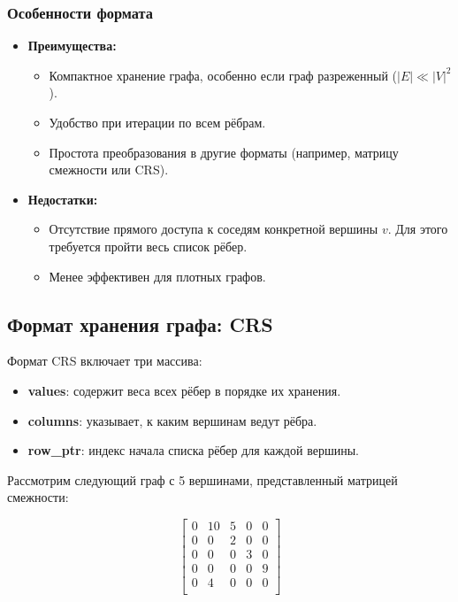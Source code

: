 \documentclass[12pt]{article}
\begin{document}
\subsubsection{Особенности формата}

\begin{itemize}
    \item \textbf{Преимущества:}
    \begin{itemize}
        \item Компактное хранение графа, особенно если граф разреженный (\( |E| \ll |V|^2 \)).
        \item Удобство при итерации по всем рёбрам.
        \item Простота преобразования в другие форматы (например, матрицу смежности или CRS).
    \end{itemize}
    \item \textbf{Недостатки:}
    \begin{itemize}
        \item Отсутствие прямого доступа к соседям конкретной вершины \( v \). Для этого требуется пройти весь список рёбер.
        \item Менее эффективен для плотных графов.
    \end{itemize}
\end{itemize}

\subsection{Формат хранения графа: CRS}

Формат CRS включает три массива:

\begin{itemize}
    \item \textbf{values}: содержит веса всех рёбер в порядке их хранения.
    \item \textbf{columns}: указывает, к каким вершинам ведут рёбра.
    \item \textbf{row\_ptr}: индекс начала списка рёбер для каждой вершины.
\end{itemize}

Рассмотрим следующий граф с 5 вершинами, представленный матрицей смежности:

\[
\begin{bmatrix}
0 & 10 & 5 & 0 & 0 \\
0 & 0 & 2 & 0 & 0 \\
0 & 0 & 0 & 3 & 0 \\
0 & 0 & 0 & 0 & 9 \\
0 & 4 & 0 & 0 & 0 \\
\end{bmatrix}
\]
\end{document}
